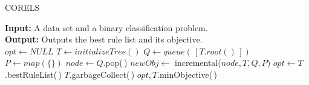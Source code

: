 \begin{algorithm}[t!]
  \caption{CORELS}
\label{alg:corels}
\begin{algorithmic}
\normalsize
\State \textbf{Input:} A data set and a binary classification problem.\\
\State \textbf{Output:} Outputs the best rule list and its objective.\\
\State $opt \gets NULL$
\State $T \gets initializeTree()$
\State $Q \gets queue(\,[T.root()\,])$
\State $P \gets map(\{\})$
	\State $node \gets Q$.pop(\,)
	\State $newObj \gets$ incremental($node, T, Q, P$) 
		\State $opt \gets T$.bestRuleList(\,)
		\State $T$.garbageCollect(\,)
	\EndIf
\EndWhile
\State \Return $opt, T$.minObjective(\,)
\end{algorithmic}
\end{algorithm}

